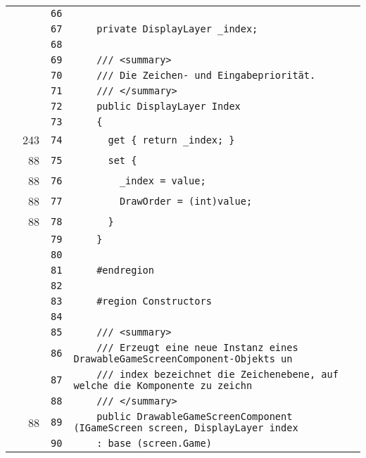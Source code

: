 \documentclass[a4paper,10pt]{article}
\begin{document}
\begin{longtable}[l]{lrrl}
\cellcolor{gray} &  & \verb~66~ & \verb~~\\
\cellcolor{gray} &  & \verb~67~ & \verb~    private DisplayLayer _index;~\\
\cellcolor{gray} &  & \verb~68~ & \verb~~\\
\cellcolor{gray} &  & \verb~69~ & \verb~    /// <summary>~\\
\cellcolor{gray} &  & \verb~70~ & \verb~    /// Die Zeichen- und Eingabepriorität.~\\
\cellcolor{gray} &  & \verb~71~ & \verb~    /// </summary>~\\
\cellcolor{gray} &  & \verb~72~ & \verb~    public DisplayLayer Index~\\
\cellcolor{gray} &  & \verb~73~ & \verb~    {~\\
\cellcolor{green} & 243 & \verb~74~ & \verb~      get { return _index; }~\\
\cellcolor{green} & 88 & \verb~75~ & \verb~      set {~\\
\cellcolor{green} & 88 & \verb~76~ & \verb~        _index = value;~\\
\cellcolor{green} & 88 & \verb~77~ & \verb~        DrawOrder = (int)value;~\\
\cellcolor{green} & 88 & \verb~78~ & \verb~      }~\\
\cellcolor{gray} &  & \verb~79~ & \verb~    }~\\
\cellcolor{gray} &  & \verb~80~ & \verb~~\\
\cellcolor{gray} &  & \verb~81~ & \verb~    #endregion~\\
\cellcolor{gray} &  & \verb~82~ & \verb~~\\
\cellcolor{gray} &  & \verb~83~ & \verb~    #region Constructors~\\
\cellcolor{gray} &  & \verb~84~ & \verb~~\\
\cellcolor{gray} &  & \verb~85~ & \verb~    /// <summary>~\\
\cellcolor{gray} &  & \verb~86~ & \verb~    /// Erzeugt eine neue Instanz eines DrawableGameScreenComponent-Objekts un~\\
\cellcolor{gray} &  & \verb~87~ & \verb~    /// index bezeichnet die Zeichenebene, auf welche die Komponente zu zeichn~\\
\cellcolor{gray} &  & \verb~88~ & \verb~    /// </summary>~\\
\cellcolor{green} & 88 & \verb~89~ & \verb~    public DrawableGameScreenComponent (IGameScreen screen, DisplayLayer index~\\
\cellcolor{gray} &  & \verb~90~ & \verb~    : base (screen.Game)~\\

\end{longtable}
\end{document}
